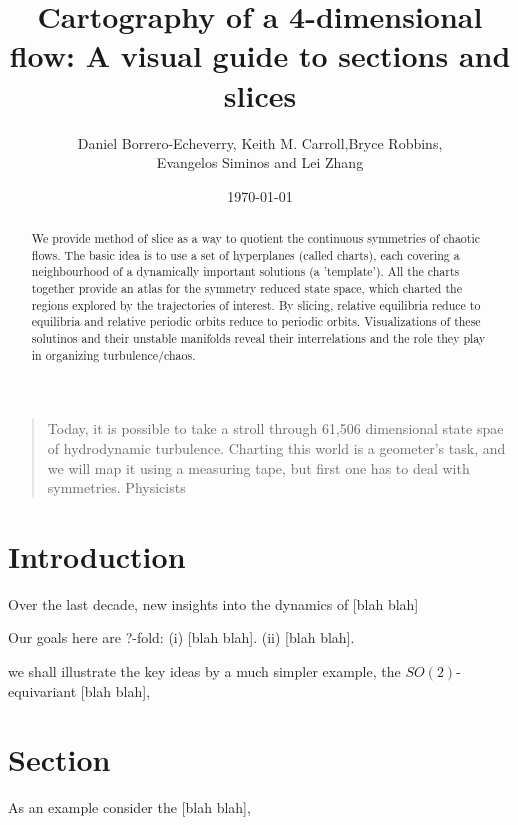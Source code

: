 \documentclass{article}
\title{Cartography of a 4-dimensional flow: A visual guide to sections and slices}
\author{Daniel Borrero-Echeverry, Keith M. Carroll,Bryce Robbins,\\ Evangelos Siminos and Lei Zhang}
\date{\today}
\begin{document}
\maketitle





    \begin{abstract}

We provide method of slice as a way to quotient the continuous symmetries of chaotic flows. The basic idea is to use a set of hyperplanes (called charts), each covering a neighbourhood of a dynamically important solutions (a 'template'). All the charts together provide an atlas for the symmetry reduced state space, which charted the regions explored by the trajectories of interest. By slicing, relative equilibria reduce to equilibria and relative periodic orbits reduce to periodic orbits. Visualizations of these solutinos and their unstable manifolds reveal their interrelations and the role they play in organizing turbulence/chaos.

    \end{abstract}



    \begin{quotation}
Today, it is possible to take a stroll through 61,506 dimensional state spae of hydrodynamic turbulence. Charting this world is a geometer's task, and we will map it using a measuring tape, but first one has to deal with symmetries. Physicists
    \end{quotation}

\section{Introduction}
\label{s:intro}

Over the last decade, new insights into the dynamics of  [blah blah]

Our goals here are ?-fold:
(i)  [blah blah].
(ii) [blah blah].

we shall illustrate the key ideas by a much
simpler example, the $SO(2)$-equivariant  [blah blah],

\section{Section}
\label{s:cut}


As an example consider the  [blah blah],
\end{document}
